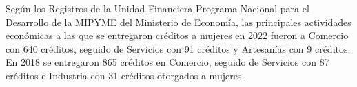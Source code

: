 Según los Registros de la Unidad Financiera Programa Nacional para el Desarrollo de la MIPYME del Ministerio de Economía, las principales actividades económicas a las que se entregaron créditos a mujeres en 2022 fueron a Comercio con 640 créditos, seguido de Servicios con 91 créditos y Artesanías con 9 créditos. En 2018 se entregaron 865 créditos en Comercio, seguido de Servicios con 87 créditos e Industria con 31 créditos otorgados a mujeres. 